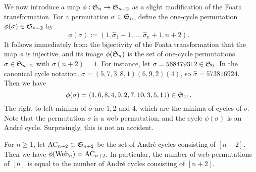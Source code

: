 We now introduce a map $\phi : \mathfrak{S}_n \rightarrow \mathfrak{S}_{n+2}$ as
a slight modification of the Foata transformation.
For a permutation $\sigma \in \mathfrak{S}_n$,
define the one-cycle permutation $\phi(\sigma) \in\mathfrak{S}_{n+2}$ by
\[
  \phi(\sigma):=(1,\widehat{\sigma}_1 +1, \dots, \widehat{\sigma}_n+1, n+2).
\]
It follows immediately from the bijectivity of the Foata transformation
that the map \( \phi \) is injective, and its image \( \phi(\mathfrak{S}_n) \) is the
set of one-cycle permutations \( \sigma\in\mathfrak{S}_{n+2} \) with \( \sigma(n+2)=1 \).
For instance, let \( \sigma=568479312\in\mathfrak{S}_9 \). In the canonical cycle notation,
\( \sigma=(5,7,3,8,1)(6,9,2)(4) \), so \( \widehat{\sigma}=573816924 \).
Then we have \[ \phi(\sigma) = (1,6,8,4,9,2,7,10,3,5,11)\in\mathfrak{S}_{11}. \]
The right-to-left minima of \( \widehat{\sigma} \) are \( 1,2 \) and \( 4 \),
which are the minima of cycles of \( \sigma \).
Note that the permutation \( \sigma \) is a web permutation,
and the cycle \( \phi(\sigma) \) is an Andr\'e cycle.
Surprisingly, this is not an accident.
\begin{thm}\label{thm:webn=Andren+2}
  For \( n\ge 1 \), let \( \operatorname{AC}_{n+2}\subset\mathfrak{S}_{n+2} \) be the set of
  Andr\'e cycles consisting of \( [n+2] \).
  Then we have \( \phi(\operatorname{Web}_n) = \operatorname{AC}_{n+2} \).
  In particular, the number of web permutations of \( [n] \) is equal to
  the number of Andr\'e cycles consisting of \( [n+2] \).
\end{thm}

